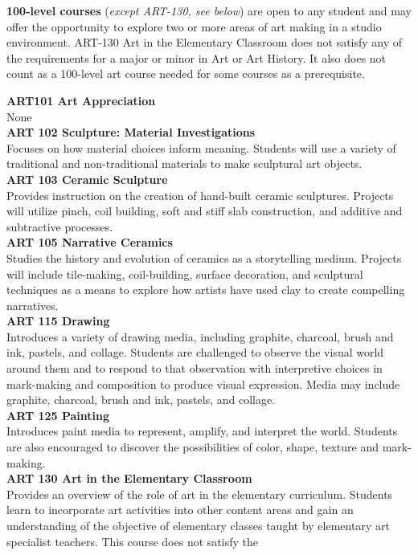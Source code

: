 \documentclass[
  letterpaper,
]{scrbook}
\begin{document}
\textbf{100-level courses} (\emph{except ART-130, see below}) are open
to any student and may offer the opportunity to explore two or more
areas of art making in a studio environment. ART-130 Art in the
Elementary Classroom does not satisfy any of the requirements for a
major or minor in Art or Art History. It also does not count as a
100-level art course needed for some courses as a prerequisite.

\textbf{ART101 Art Appreciation}\\
None\\
\textbf{ART 102 Sculpture: Material Investigations}\\
Focuses on how material choices inform meaning. Students will use a
variety of traditional and non-traditional materials to make sculptural
art objects.\\
\textbf{ART 103 Ceramic Sculpture}\\
Provides instruction on the creation of hand-built ceramic sculptures.
Projects will utilize pinch, coil building, soft and stiff slab
construction, and additive and subtractive processes.\\
\textbf{ART 105 Narrative Ceramics}\\
Studies the history and evolution of ceramics as a storytelling medium.
Projects will include tile-making, coil-building, surface decoration,
and sculptural techniques as a means to explore how artists have used
clay to create compelling narratives.\\
\textbf{ART 115 Drawing}\\
Introduces a variety of drawing media, including graphite, charcoal,
brush and ink, pastels, and collage. Students are challenged to observe
the visual world around them and to respond to that observation with
interpretive choices in mark-making and composition to produce visual
expression. Media may include graphite, charcoal, brush and ink,
pastels, and collage.\\
\textbf{ART 125 Painting}\\
Introduces paint media to represent, amplify, and interpret the world.
Students are also encouraged to discover the possibilities of color,
shape, texture and mark-making.\\
\textbf{ART 130 Art in the Elementary Classroom}\\
Provides an overview of the role of art in the elementary curriculum.
Students learn to incorporate art activities into other content areas
and gain an understanding of the objective of elementary classes taught
by elementary art specialist teachers. This course does not satisfy the
\end{document}
